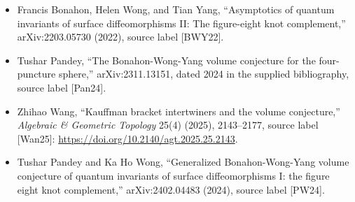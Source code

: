 \documentclass[11pt]{article}
\begin{document}
\begin{itemize}
\item Francis Bonahon, Helen Wong, and Tian Yang, ``Asymptotics of quantum invariants of surface diffeomorphisms II: The figure-eight knot complement,'' arXiv:2203.05730 (2022), source label [BWY22].
\item Tushar Pandey, ``The Bonahon-Wong-Yang volume conjecture for the four-puncture sphere,'' arXiv:2311.13151, dated 2024 in the supplied bibliography, source label [Pan24].
\item Zhihao Wang, ``Kauffman bracket intertwiners and the volume conjecture,'' \emph{Algebraic \& Geometric Topology} 25(4) (2025), 2143--2177, source label [Wan25]: \url{https://doi.org/10.2140/agt.2025.25.2143}.
\item Tushar Pandey and Ka Ho Wong, ``Generalized Bonahon-Wong-Yang volume conjecture of quantum invariants of surface diffeomorphisms I: the figure eight knot complement,'' arXiv:2402.04483 (2024), source label [PW24].
\end{itemize}
\end{document}
